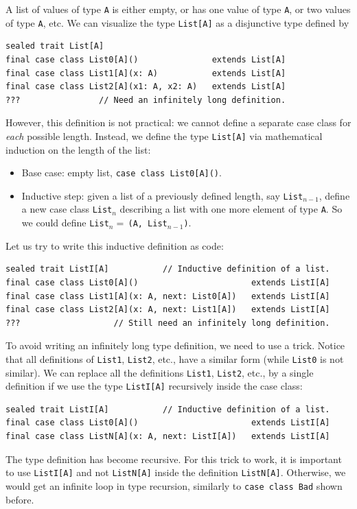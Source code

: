 A list of values of type \lstinline!A! is either empty, or has one
value of type \lstinline!A!, or two values of type \lstinline!A!,
etc. We can visualize the type \lstinline!List[A]! as a disjunctive
type defined by
\begin{lstlisting}
sealed trait List[A]
final case class List0[A]()               extends List[A]
final case class List1[A](x: A)           extends List[A]
final case class List2[A](x1: A, x2: A)   extends List[A]
???                // Need an infinitely long definition.
\end{lstlisting}
However, this definition is not practical: we cannot define a separate
case class for \emph{each} possible length. Instead, we define the
type \lstinline!List[A]! via mathematical induction on the length
of the list:
\begin{itemize}
\item Base case: empty list, \lstinline!case class List0[A]()!.
\item Inductive step: given a list of a previously defined length, say \lstinline!List!$_{n-1}$,
define a new case class \lstinline!List!$_{n}$ describing a list
with one more element of type \lstinline!A!. So we could define \lstinline!List!$_{n}=\,$\lstinline!(A, List!$_{n-1}$\lstinline!)!.
\end{itemize}
Let us try to write this inductive definition as code:
\begin{lstlisting}
sealed trait ListI[A]           // Inductive definition of a list.
final case class List0[A]()                       extends ListI[A]
final case class List1[A](x: A, next: List0[A])   extends ListI[A]
final case class List2[A](x: A, next: List1[A])   extends ListI[A]
???                   // Still need an infinitely long definition.
\end{lstlisting}
To avoid writing an infinitely long type definition, we need to use
a trick. Notice that all definitions of \lstinline!List1!, \lstinline!List2!,
etc., have a similar form (while \lstinline!List0! is not similar).
We can replace all the definitions \lstinline!List1!, \lstinline!List2!,
etc., by a single definition if we use the type \lstinline!ListI[A]!
recursively inside the case class:
\begin{lstlisting}
sealed trait ListI[A]           // Inductive definition of a list.
final case class List0[A]()                       extends ListI[A]
final case class ListN[A](x: A, next: ListI[A])   extends ListI[A]
\end{lstlisting}
The type definition has become recursive. For this trick to work,
it is important to use \lstinline!ListI[A]! and not \lstinline!ListN[A]!
inside the definition \lstinline!ListN[A]!. Otherwise, we would get
an infinite loop in type recursion,
similarly to \lstinline!case class Bad! shown before.


